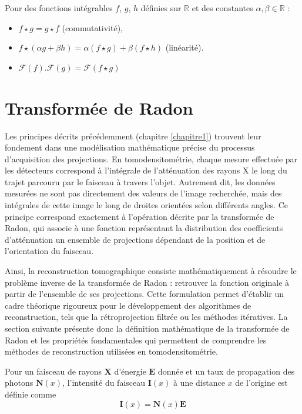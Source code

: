 \begin{proposition}
    Pour des fonctions intégrables $f$, $g$, $h$ définies sur $\mathbb{R}$
    et des constantes $\alpha, \beta \in \mathbb{R}$ :
    
    \begin{itemize}
      \item[(i)] $f \star g = g \star f$ \quad (commutativité),
      \item[(ii)] $f \star (\alpha g + \beta h)
      = \alpha (f \star g) + \beta (f \star h)$ \quad (linéarité).
      \item[(iii)] $\mathcal{F}(f). \mathcal{F}(g)  = \mathcal{F}(f \star g)$
    \end{itemize}
\end{proposition}


\section{Transformée de Radon}
Les principes décrits précédemment (chapitre \ref{chapitre1}) trouvent leur fondement dans une modélisation mathématique précise du processus d'acquisition des projections. En tomodensitométrie, chaque mesure effectuée par les détecteurs correspond à l'intégrale de l'atténuation des rayons X le long du trajet parcouru par le faisceau à travers l'objet. Autrement dit, les données mesurées ne sont pas directement des valeurs de l'image recherchée, mais des intégrales de cette image le long de droites orientées selon différents angles. Ce principe correspond exactement à l'opération décrite par la transformée de Radon, qui associe à une fonction représentant la distribution des coefficients d'atténuation un ensemble de projections dépendant de la position et de l'orientation du faisceau.

Ainsi, la reconstruction tomographique consiste mathématiquement à résoudre le problème inverse de la transformée de Radon : retrouver la fonction originale à partir de l'ensemble de ses projections. Cette formulation permet d'établir un cadre théorique rigoureux pour le développement des algorithmes de reconstruction, tels que la rétroprojection filtrée ou les méthodes itératives. La section suivante présente donc la définition mathématique de la transformée de Radon et les propriétés fondamentales qui permettent de comprendre les méthodes de reconstruction utilisées en tomodensitométrie.
\begin{definition}
    Pour un faisceau de rayons $\mathbf{X}$ d'énergie $\mathbf{E}$ donnée et un taux de propagation des photons $\mathbf{N}(x)$, l'intensité du faisceau $\mathbf{I}(x)$ à une distance $x$ de l'origine est définie comme \begin{equation}\mathbf{I}(x) = \mathbf{N}(x) \mathbf{E}\end{equation}
\end{definition}

